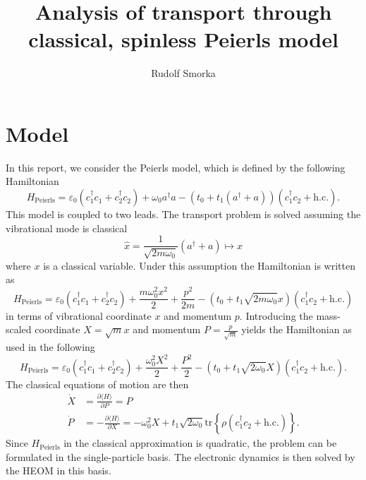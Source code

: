 \documentclass{article}
\newcommand{\pdagger}{{\phantom{\dagger}}}
\newcommand{\tr}[1]{\mathrm{tr}\left\{#1\right\}}
\begin{document}
\title{Analysis of transport through classical, spinless Peierls model}
\author{Rudolf Smorka}
\maketitle
\section{Model}\label{sec:Aim}
In this report, we consider the Peierls model, which is defined by the following Hamiltonian
\begin{equation}
	H_\mathrm{Peierls} = \varepsilon_0 (c_1^\dagger c_1^\pdagger + c_2^\dagger c_2^\pdagger)+ \omega_0 a^\dagger a -(t_0 + t_1(a^\dagger + a))(c_1^\dagger c_2^\pdagger + \mathrm{h.c.}).
\end{equation}
This model is coupled to two leads. The transport problem is solved assuming the vibrational mode is classical
\begin{equation}
	\hat{x} = \frac{1}{\sqrt{2m\omega_0}} (a^\dagger + a) \mapsto x
\end{equation}
where $x$ is a classical variable. Under this assumption the Hamiltonian is written as 
\begin{equation}
	H_\mathrm{Peierls} = \varepsilon_0 (c_1^\dagger c_1^\pdagger + c_2^\dagger c_2^\pdagger)+ \frac{m\omega_0^2 x^2}{2} + \frac{p^2}{2 m} -\left(t_0 + t_1\sqrt{2m\omega_0}x\right)(c_1^\dagger c_2^\pdagger + \mathrm{h.c.})
\end{equation}
in terms of vibrational coordinate $x$ and momentum $p$. Introducing the mass-scaled coordinate $X = \sqrt{m}x$ and momentum $P = \frac{p}{\sqrt{m}}$ yields the Hamiltonian as used in the following
\begin{equation}
	H_\mathrm{Peierls} = \varepsilon_0 (c_1^\dagger c_1^\pdagger + c_2^\dagger c_2^\pdagger)+ \frac{\omega_0^2 X^2}{2} + \frac{P^2}{2} -\left(t_0 + t_1\sqrt{2\omega_0}X\right)(c_1^\dagger c_2^\pdagger + \mathrm{h.c.}).
\end{equation}
The classical equations of motion are then
\begin{align}
	\dot{X} &= \frac{\partial \langle H\rangle}{\partial P} = P \\
	\dot{P} &= -\frac{\partial\langle  H\rangle}{\partial X} = -\omega_0^2 X +t_1\sqrt{2 \omega_0}\tr{\rho(c_1^\dagger c_2^\pdagger + \mathrm{h.c.})}.
\end{align}
Since $H_\mathrm{Peierls}$ in the classical approximation is quadratic, the problem can be formulated in the single-particle basis. The electronic dynamics is then solved by the HEOM in this basis. 
\end{document}
